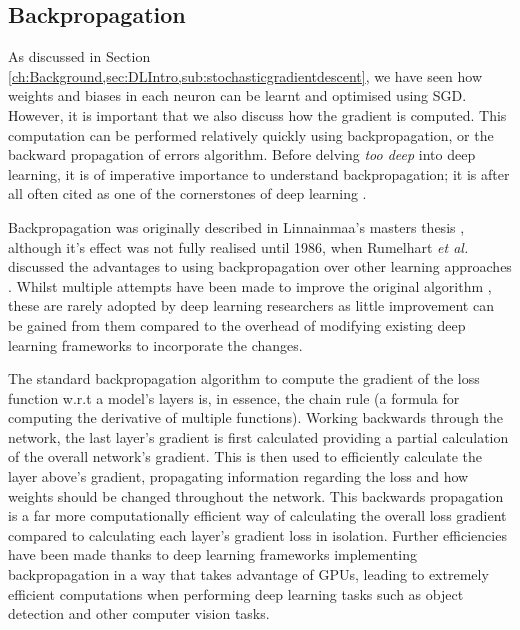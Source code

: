 \subsection{Backpropagation}\label{ch:Background,sec:DLIntro,sub:backprop}
As discussed in Section \ref{ch:Background,sec:DLIntro,sub:stochasticgradientdescent}, we have seen how weights and biases in each neuron can be learnt and optimised using SGD. However, it is important that we also discuss how the gradient is computed. This computation can be performed relatively quickly using backpropagation, or the backward propagation of errors algorithm. Before delving \textit{too deep} into deep learning, it is of imperative importance to understand backpropagation; it is after all often cited as one of the cornerstones of deep learning \cite{alber_backprop_2018}.

Backpropagation was originally described in Linnainmaa's masters thesis \cite{linnainmaa_representation_1970}, although it's effect was not fully realised until 1986, when Rumelhart \textit{et al.} discussed the advantages to using backpropagation over other learning approaches \cite{rumelhart_learning_1986}. Whilst multiple attempts have been made to improve the original algorithm \cite{bengio_use_1994, lillicrap_random_2014, lee_difference_2015, nokland_direct_2016, liao_how_2016}, these are rarely adopted by deep learning researchers as little improvement can be gained from them compared to the overhead of modifying existing deep learning frameworks to incorporate the changes. 

The standard backpropagation algorithm to compute the gradient of the loss function w.r.t a model's layers is, in essence, the chain rule (a formula for computing the derivative of multiple functions). Working backwards through the network, the last layer's gradient is first calculated providing a partial calculation of the overall network's gradient. This is then used to efficiently calculate the layer above's gradient, propagating information regarding the loss and how weights should be changed throughout the network. This backwards propagation is a far more computationally efficient way of calculating the overall loss gradient compared to calculating each layer's gradient loss in isolation. Further efficiencies have been made thanks to deep learning frameworks implementing backpropagation in a way that takes advantage of GPUs, leading to extremely efficient computations when performing deep learning tasks such as object detection and other computer vision tasks.


